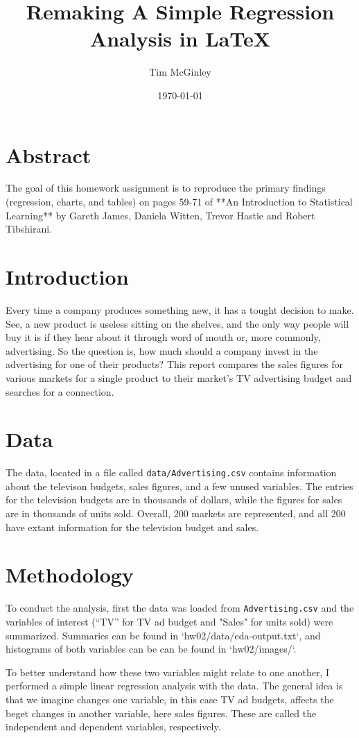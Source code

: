 \documentclass{article}
\title{Remaking A Simple Regression Analysis in LaTeX}
\author{Tim McGinley}
\begin{document}

\date{\today}
\maketitle


\section{Abstract}
The goal of this homework assignment is to reproduce the primary findings (regression, charts, and tables) on pages 59-71 of **An Introduction to Statistical Learning** by Gareth James, Daniela Witten, Trevor Hastie and Robert Tibshirani.


\section{Introduction}
Every time a company produces something new, it has a tought decision to make.  See, a new product is useless sitting on the shelves, and the only way people will buy it is if they hear about it through word of mouth or, more commonly, advertising.  So the question is, how much should a company invest in the advertising for one of their products? This report compares the sales figures for various markets for a single product to their market's TV advertising budget and searches for a connection. 

\section{Data}
The data, located in a file called \texttt{data/Advertising.csv} contains information about the televison budgets, sales figures, and a few unused variables.  The entries for the television budgets are in thousands of dollars, while the figures for sales are in thousands of units sold. Overall, 200 markets are represented, and all 200 have extant information for the television budget and sales. 

\section{Methodology}
To conduct the analysis, first the data was loaded from \texttt{Advertising.csv} and the variables of interest (``TV'' for TV ad budget and "Sales" for units sold) were summarized. Summaries can be found in 
`hw02/data/eda-output.txt`, and histograms of both variables can be can be found in `hw02/images/`.  

To better understand how these two variables might relate to one another, I performed a simple linear regression analysis with the data.  The general idea is that we imagine changes one variable, in this case TV ad budgets, affects the beget changes in another variable, here sales figures. These are called the independent and dependent variables, respectively.  
\end{document}

